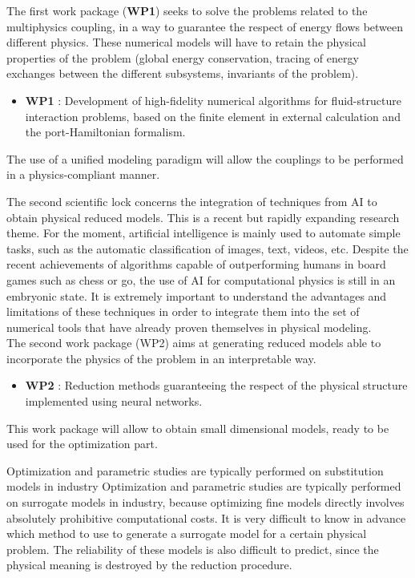 \documentclass[12pt]{article}
\begin{document}
	The first work package (\textbf{WP1}) seeks to solve the problems related to the multiphysics coupling, in a way to guarantee the respect of energy flows between different physics. These numerical models will have to retain the physical properties of the problem (global energy conservation, tracing of energy exchanges between the different subsystems, invariants of the problem). \\
	
	\begin{itemize}
		\item \textbf{WP1} : Development of high-fidelity numerical algorithms for fluid-structure interaction problems, based on the finite element in external calculation and the port-Hamiltonian formalism. \\
	\end{itemize}
	
	The use of a unified modeling paradigm will allow the couplings to be performed in a physics-compliant manner.
	
	The second scientific lock concerns the integration of techniques from AI to obtain physical reduced models. This is a recent but rapidly expanding research theme. For the moment, artificial intelligence is mainly used to automate simple tasks, such as the automatic classification of images, text, videos, etc. Despite the recent achievements of algorithms capable of outperforming humans in board games such as chess or go, the use of AI for computational physics is still in an embryonic state. It is extremely important to understand the advantages and limitations of these techniques in order to integrate them into the set of numerical tools that have already proven themselves in physical modeling. \\
	
	The second work package (WP2) aims at generating reduced models able to incorporate the physics of the problem in an interpretable way. \\
	
	\begin{itemize}
		\item \textbf{WP2} : Reduction methods guaranteeing the respect of the physical structure implemented using neural networks.
	\end{itemize}
	
	This work package will allow to obtain small dimensional models, ready to be used for the optimization part. 
	
	Optimization and parametric studies are typically performed on substitution models in industry
	Optimization and parametric studies are typically performed on surrogate models in industry, because optimizing fine models directly involves absolutely prohibitive computational costs. It is very difficult to know in advance which method to use to generate a surrogate model for a certain physical problem. The reliability of these models is also difficult to predict, since the physical meaning is destroyed by the reduction procedure. \\
	
\end{document}
